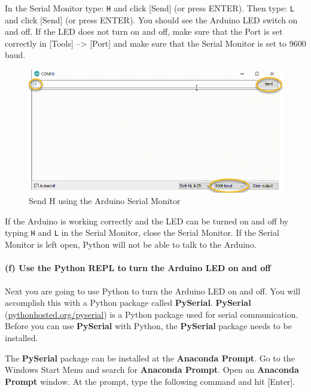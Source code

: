 In the Serial Monitor type: \texttt{H} and click {[}Send{]} (or press
ENTER). Then type: \texttt{L} and click {[}Send{]} (or press ENTER). You
should see the Arduino LED switch on and off. If the LED does not turn
on and off, make sure that the Port is set correctly in {[}Tools{]}
--\textgreater{} {[}Port{]} and make sure that the Serial Monitor is set
to 9600 baud.

\begin{figure}[h!]
\centering
\includegraphics{images/serial_monitor_H.png}
\caption{Send H using the Arduino Serial Monitor}
\end{figure}

If the Arduino is working correctly and the LED can be turned on and off
by typing \texttt{H} and \texttt{L} in the Serial Monitor, close the
Serial Monitor. If the Serial Monitor is left open, Python will not be
able to talk to the Arduino.

    \hypertarget{f-use-the-python-repl-to-turn-the-arduino-led-on-and-off}{%
\paragraph{(f) Use the Python REPL to turn the Arduino LED on and
off}\label{f-use-the-python-repl-to-turn-the-arduino-led-on-and-off}}

Next you are going to use Python to turn the Arduino LED on and off. You
will accomplish this with a Python package called \textbf{PySerial}.
\textbf{PySerial}
(\href{https://pythonhosted.org/pyserial/}{pythonhosted.org/pyserial})
is a Python package used for serial communication. Before you can use
\textbf{PySerial} with Python, the \textbf{PySerial} package needs to be
installed.

The \textbf{PySerial} package can be installed at the \textbf{Anaconda
Prompt}. Go to the Windows Start Menu and search for \textbf{Anaconda
Prompt}. Open an \textbf{Anaconda Prompt} window. At the prompt, type
the following command and hit {[}Enter{]}.

